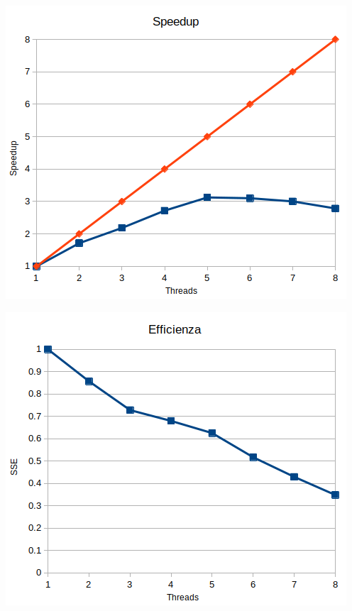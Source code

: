 \documentclass[report]{subfiles}
\begin{document}
	\hfill
	\begin{minipage}{.45\textwidth}
		\centering
		\includegraphics[width=\linewidth]{speedup-no-gui}
		\label{fig:speedup-no-gui}
	\end{minipage}
	\hfill
	\begin{minipage}{.45\textwidth}
		\centering
		\includegraphics[width=\linewidth]{sse-no-gui}
		\label{fig:sse-no-gui}
	\end{minipage}
	\hfill
	
\end{document}
